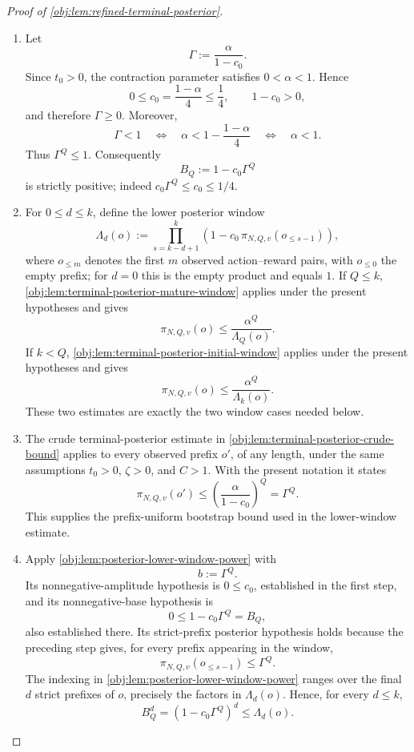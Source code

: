 \documentclass[11pt]{article}
\begin{document}
\begin{proof}[Proof of \cref{obj:lem:refined-terminal-posterior}]
\begin{enumerate}
\item
Let
\[
\Gamma:=\frac{\alpha}{1-c_0}.
\]
Since \(t_0>0\), the contraction parameter satisfies \(0<\alpha<1\).  Hence
\[
0\le c_0=\frac{1-\alpha}{4}\le \frac14,
\qquad
1-c_0>0,
\]
and therefore \(\Gamma\ge0\).  Moreover,
\[
\Gamma<1
\quad\Longleftrightarrow\quad
\alpha<1-\frac{1-\alpha}{4}
\quad\Longleftrightarrow\quad
\alpha<1.
\]
Thus \(\Gamma^Q\le1\).  Consequently
\[
B_Q:=1-c_0\Gamma^Q
\]
is strictly positive; indeed \(c_0\Gamma^Q\le c_0\le1/4\). %

\item
For \(0\le d\le k\), define the lower posterior window
\[
\Lambda_d(o)
:=
\prod_{s=k-d+1}^{k}
\left(1-c_0\,\pi_{N,Q,v}(o_{\le s-1})\right),
\]
where \(o_{\le m}\) denotes the first \(m\) observed action--reward pairs, with \(o_{\le0}\) the empty prefix; for \(d=0\) this is the empty product and equals \(1\).  If \(Q\le k\), \cref{obj:lem:terminal-posterior-mature-window} applies under the present hypotheses and gives
\[
\pi_{N,Q,v}(o)
\le
\frac{\alpha^Q}{\Lambda_Q(o)}.
\]
If \(k<Q\), \cref{obj:lem:terminal-posterior-initial-window} applies under the present hypotheses and gives
\[
\pi_{N,Q,v}(o)
\le
\frac{\alpha^Q}{\Lambda_k(o)}.
\]
These two estimates are exactly the two window cases needed below. %

\item
The crude terminal-posterior estimate in \cref{obj:lem:terminal-posterior-crude-bound} applies to every observed prefix \(o'\), of any length, under the same assumptions \(t_0>0\), \(\zeta>0\), and \(C>1\).  With the present notation it states
\[
\pi_{N,Q,v}(o')
\le
\left(\frac{\alpha}{1-c_0}\right)^Q
=
\Gamma^Q.
\]
This supplies the prefix-uniform bootstrap bound used in the lower-window estimate. %

\item
Apply \cref{obj:lem:posterior-lower-window-power} with
\[
b:=\Gamma^Q.
\]
Its nonnegative-amplitude hypothesis is \(0\le c_0\), established in the first step, and its nonnegative-base hypothesis is
\[
0\le 1-c_0\Gamma^Q=B_Q,
\]
also established there.  Its strict-prefix posterior hypothesis holds because the preceding step gives, for every prefix appearing in the window,
\[
\pi_{N,Q,v}(o_{\le s-1})\le \Gamma^Q.
\]
The indexing in \cref{obj:lem:posterior-lower-window-power} ranges over the final \(d\) strict prefixes of \(o\), precisely the factors in \(\Lambda_d(o)\).  Hence, for every \(d\le k\),
\[
B_Q^d
=
\left(1-c_0\Gamma^Q\right)^d
\le
\Lambda_d(o).
\] %


\end{enumerate}
\end{proof}
\end{document}
